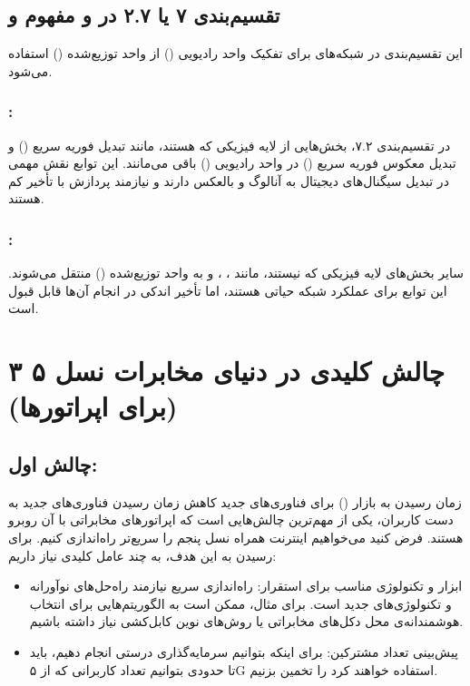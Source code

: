 \documentclass[landscape, 12pt]{report}
\begin{document}
\subsection*{تقسیم‌بندی ۷ یا ۲.۷ در  و مفهوم  و }
این تقسیم‌بندی در شبکه‌های  برای تفکیک واحد رادیویی () از واحد توزیع‌شده () استفاده می‌شود.

\subsubsection*{:}
در تقسیم‌بندی ۷.۲، بخش‌هایی از لایه فیزیکی که  هستند، مانند تبدیل فوریه سریع () و تبدیل معکوس فوریه سریع () در واحد رادیویی () باقی می‌مانند. این توابع نقش مهمی در تبدیل سیگنال‌های دیجیتال به آنالوگ و بالعکس دارند و نیازمند پردازش با تأخیر کم هستند.

\subsubsection*{:}
سایر بخش‌های لایه فیزیکی که  نیستند، مانند ، ،  و  به واحد توزیع‌شده () منتقل می‌شوند. این توابع برای عملکرد شبکه حیاتی هستند، اما تأخیر اندکی در انجام آن‌ها قابل قبول است.
\section*{
۳ چالش کلیدی در دنیای مخابرات نسل ۵ (برای اپراتورها)
}
\subsection*{چالش اول:}
 زمان رسیدن به بازار () برای فناوری‌های جدید
کاهش زمان رسیدن فناوری‌های جدید به دست کاربران، یکی از مهم‌ترین چالش‌هایی است که اپراتورهای مخابراتی با آن روبرو هستند. فرض کنید می‌خواهیم اینترنت همراه نسل پنجم  را سریع‌تر راه‌اندازی کنیم. برای رسیدن به این هدف، به چند عامل کلیدی نیاز داریم:
\begin{itemize}
\item ابزار و تکنولوژی مناسب برای استقرار: راه‌اندازی سریع 
 نیازمند راه‌حل‌های نوآورانه و تکنولوژی‌های جدید است. برای مثال، ممکن است به الگوریتم‌هایی برای انتخاب هوشمندانه‌ی محل دکل‌های مخابراتی یا روش‌های نوین کابل‌کشی نیاز داشته باشیم.
\item پیش‌بینی تعداد مشترکین: برای اینکه بتوانیم سرمایه‌گذاری درستی انجام دهیم، باید تا حدودی بتوانیم تعداد کاربرانی که از ۵G استفاده خواهند کرد را تخمین بزنیم.
\end{itemize}
\end{document}
